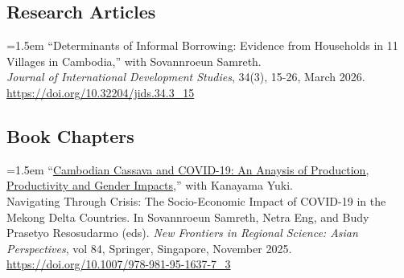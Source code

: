 \documentclass[10pt,a4paper]{article}
\begin{document}
	




\subsection*{Research Articles}
	\hangindent=1.5em
``Determinants of Informal Borrowing: Evidence from Households in 11 Villages in Cambodia,'' with Sovannroeun Samreth. \\
\textit{Journal of International Development Studies},  34(3), 15-26, March 2026. \url{https://doi.org/10.32204/jids.34.3_15}


\subsection*{Book Chapters}

\hangindent=1.5em
“\href{https://link.springer.com/chapter/10.1007/978-981-95-1637-7_3}{Cambodian Cassava and COVID-19: An Anaysis of Production, Productivity and Gender Impacts},” with Kanayama Yuki. \\
Navigating Through Crisis: The Socio-Economic Impact of COVID-19 in the Mekong Delta Countries. In Sovannroeun Samreth, Netra Eng, and Budy Prasetyo Resosudarmo (eds). \textit{New Frontiers in Regional Science: Asian Perspectives}, vol 84, Springer, Singapore, November 2025. \url{https://doi.org/10.1007/978-981-95-1637-7_3} \\ \vspace{-.5em} 
\end{document}
